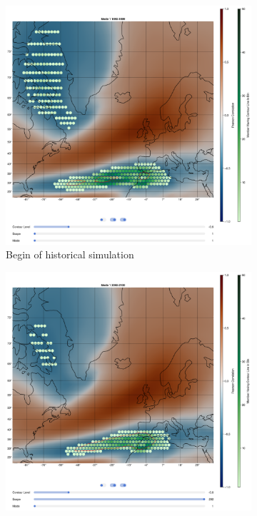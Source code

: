 \begin{figure}[!htb]
  \begin{subfigure}[b]{0.32\textwidth}
    \includegraphics[width=\textwidth]{figures/psl_ivt_cor_mode1_historical.png}
    \caption{Begin of historical simulation}
    \label{fig:psl eof ivt cor historical mode1}
  \end{subfigure}
  \hfill
  \begin{subfigure}[b]{0.32\textwidth}
    \includegraphics[width=\textwidth]{figures/psl_ivt_cor_mode1_ssp126.png}

\end{subfigure}
\end{figure}
